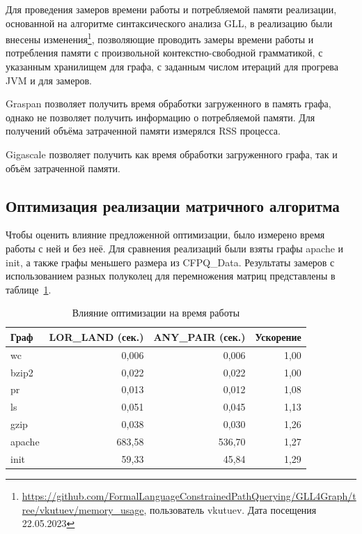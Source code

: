 Для проведения замеров времени работы и потребляемой памяти реализации, основанной на алгоритме синтаксического анализа GLL, в реализацию были внесены изменения\footnote{\url{https://github.com/FormalLanguageConstrainedPathQuerying/GLL4Graph/tree/vkutuev/memory_usage}, пользователь vkutuev. Дата посещения 22.05.2023}, позволяющие проводить замеры времени работы и потребления памяти с произвольной контекстно-свободной грамматикой, с указанным хранилищем для графа, с заданным числом итераций для прогрева JVM и для замеров.

Graspan позволяет получить время обработки загруженного в память графа, однако не позволяет получить информацию о потребляемой памяти. Для получений объёма затраченной памяти измерялся RSS процесса.

Gigascale позволяет получить как время обработки загруженного графа, так и объём затраченной памяти.

\subsection{Оптимизация реализации матричного алгоритма}

Чтобы оценить влияние предложенной оптимизации, было измерено время работы с ней и без неё. Для сравнения реализаций были взяты графы apache и init, а также графы меньшего размера из CFPQ\_Data. Результаты замеров с использованием разных полуколец для перемножения матриц представлены в таблице~\ref{tab:any_pair_res}.


\begin{table}[h!]
    \centering
    \begin{tabular}{|l|r|r|r|}
    \hline
    Граф & LOR\_LAND (сек.) & ANY\_PAIR (сек.) & Ускорение \\ \hline
    wc & 0,006 & 0,006 & 1,00 \\ \hline
    bzip2 & 0,022 & 0,022 & 1,00 \\ \hline
    pr & 0,013 & 0,012 & 1,08 \\ \hline
    ls & 0,051 & 0,045 & 1,13 \\ \hline
    gzip & 0,038 & 0,030 & 1,26 \\ \hline
    apache & 683,58 & 536,70 & 1,27 \\ \hline
    init & 59,33 & 45,84 & 1,29 \\ \hline
    \end{tabular}%
\caption{Влияние оптимизации на время работы}
\label{tab:any_pair_res}
\end{table}

